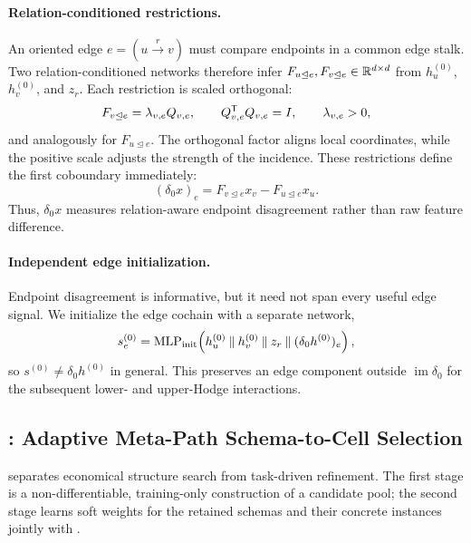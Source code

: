 \paragraph{Relation-conditioned restrictions.}
An oriented edge \(e=(u\xrightarrow{r}v)\) must compare endpoints in a common edge stalk.  Two
relation-conditioned networks therefore infer
\(F_{u\unlhd e},F_{v\unlhd e}\in\mathbb{R}^{d\times d}\) from
\(h_u^{(0)}\), \(h_v^{(0)}\), and \(z_r\).  Each restriction is scaled orthogonal:
\begin{equation}
  F_{v\unlhd e}=\lambda_{v,e}Q_{v,e},
  \qquad Q_{v,e}^{\mathsf{T}}Q_{v,e}=I,
  \qquad \lambda_{v,e}>0 ,
  \label{eq:conformal-map}
\end{equation}
and analogously for \(F_{u\unlhd e}\).  The orthogonal factor aligns local coordinates, while the
positive scale adjusts the strength of the incidence.  These restrictions define the first
coboundary immediately:
\begin{equation}
  (\delta_0x)_e
  =F_{v\unlhd e}x_v-F_{u\unlhd e}x_u .
  \label{eq:delta0}
\end{equation}
Thus, \(\delta_0x\) measures relation-aware endpoint disagreement rather than raw feature
difference.

\paragraph{Independent edge initialization.}
Endpoint disagreement is informative, but it need not span every useful edge signal.  We initialize
the edge cochain with a separate network,
\begin{equation}
  s_e^{(0)}
  =\operatorname{MLP}_{\mathrm{init}}\!\left(
    h_u^{(0)}\mathbin\Vert h_v^{(0)}\mathbin\Vert z_r
    \mathbin\Vert(\delta_0h^{(0)})_e
  \right),
  \label{eq:edge-init}
\end{equation}
so \(s^{(0)}\neq\delta_0h^{(0)}\) in general.  This preserves an edge component outside
\(\operatorname{im}\delta_0\) for the subsequent lower- and upper-Hodge interactions.

\subsection{\ampss{}: Adaptive Meta-Path Schema-to-Cell Selection}
\label{sec:ampss}

\ampss{} separates economical structure search from task-driven refinement.  The first stage is a
non-differentiable, training-only construction of a candidate pool; the second stage learns soft
weights for the retained schemas and their concrete instances jointly with \method{}.

